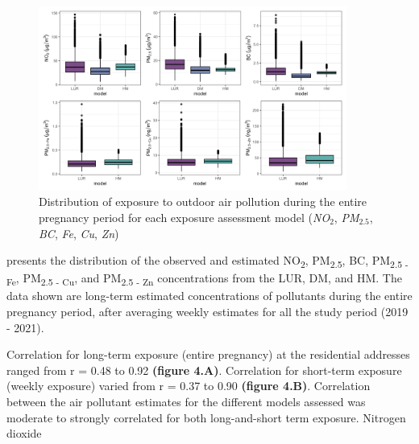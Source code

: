 \documentclass{article}
\begin{document}
\begin{figure}[!htb]
\includegraphics[width=0.9\textwidth]{figures/boxplot_all_models_estimates.png}
\caption{Distribution of exposure to outdoor air pollution during the entire pregnancy period for each exposure assessment model (\textit{NO$_2$}, \textit{PM$_{2.5}$}, \textit{BC}, \textit{Fe}, \textit{Cu}, \textit{Zn})}
\label{fig3}
\end{figure}

\textbf{} presents the distribution of the observed and estimated NO\textsubscript{2}, PM\textsubscript{2.5}, BC,  PM\textsubscript{2.5 - Fe}, PM\textsubscript{2.5 - Cu}, and PM\textsubscript{2.5 - Zn} concentrations from the LUR, DM, and HM. The data shown are long-term estimated concentrations of pollutants during the entire pregnancy period, after averaging weekly estimates for all the study period (2019 - 2021).   
\newpage

Correlation for long-term exposure (entire pregnancy) at the residential addresses ranged from r = 0.48 to 0.92 \textbf{(figure 4.A)}. Correlation for short-term exposure (weekly exposure) varied from r = 0.37 to 0.90 \textbf{(figure 4.B)}. Correlation between the air pollutant estimates for the different models assessed was moderate to strongly correlated for both long-and-short term exposure. Nitrogen dioxide 
\end{document}
